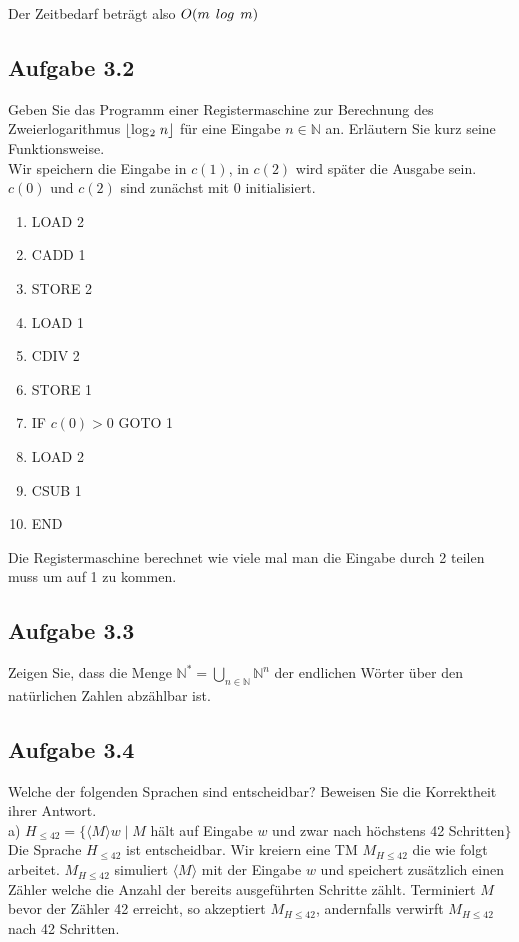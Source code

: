 Der Zeitbedarf beträgt also $O(m \hspace{0,15cm} log \hspace{0,15cm} m)$

\newpage

\subsection*{Aufgabe 3.2} Geben Sie das Programm einer Registermaschine zur Berechnung des Zweierlogarithmus $\lfloor $log$_2 \hspace{0,1cm} n \rfloor$ für eine Eingabe $n \in \mathbb{N}$ an. Erläutern Sie kurz seine Funktionsweise.\\

Wir speichern die Eingabe in $c(1)$, in $c(2)$ wird später die Ausgabe sein. $c(0)$ und $c(2)$ sind zunächst mit 0 initialisiert.
\begin{enumerate}
	\item LOAD 2
	\item CADD 1
	\item STORE 2
	\item LOAD 1
	\item CDIV 2
	\item STORE 1
	\item IF $c(0) > 0$ GOTO 1
	\item LOAD 2
	\item CSUB 1
	\item END
\end{enumerate}
Die Registermaschine berechnet wie viele mal man die Eingabe durch 2 teilen muss um auf 1 zu kommen.

\subsection*{Aufgabe 3.3}
Zeigen Sie, dass die Menge $\mathbb{N}^* = \bigcup_{n \in \mathbb{N}} \mathbb{N}^n$ der endlichen Wörter über den natürlichen Zahlen abzählbar ist.


\newpage
\subsection*{Aufgabe 3.4}
Welche der folgenden Sprachen sind entscheidbar? Beweisen Sie die Korrektheit ihrer Antwort.\\
a) $H_{\leq 42} = \{\langle M \rangle w \mid M$ hält auf Eingabe $w$ und zwar nach höchstens 42 Schritten$\}$\\

Die Sprache $H_{\leq 42}$ ist entscheidbar. Wir kreiern eine 
TM $M_{H \leq 42}$ die wie folgt arbeitet. $M_{H \leq 42}$
 simuliert $\langle M \rangle$ mit der Eingabe $w$ und 
speichert zusätzlich einen Zähler welche die Anzahl der bereits
ausgeführten Schritte
zählt. Terminiert $M$ bevor der Zähler 42 erreicht, so akzeptiert
$M_{H \leq 42}$, andernfalls verwirft $M_{H \leq 42}$ nach 42
Schritten.\\

